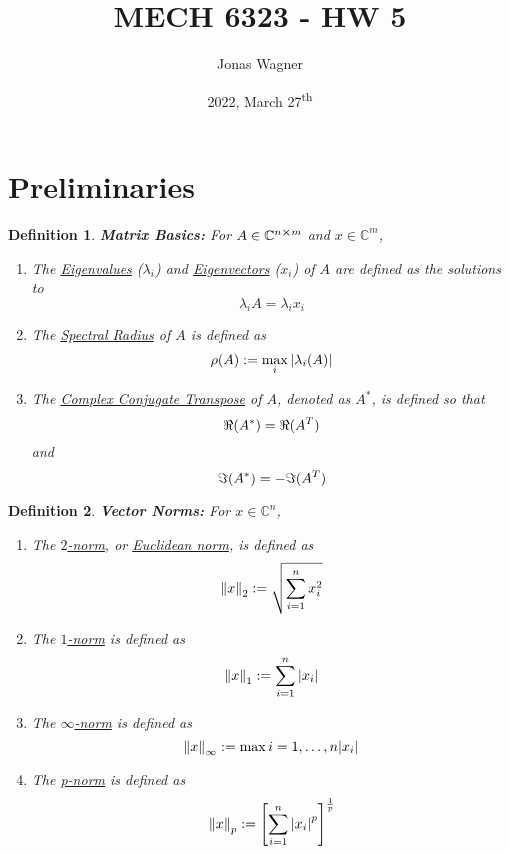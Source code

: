 \documentclass[letter]{article}
\title{MECH 6323 - HW 5}
\author{Jonas Wagner}
\date{2022, March 27\textsuperscript{th}}
\numberwithin{equation}{section}
\newcommand{\C}{\mathbb{C}}
\newtheorem{definition}{Definition}
\begin{document}
	

\maketitle

\tableofcontents



\newpage
\section*{Preliminaries}

\begin{definition}
    \textbf{Matrix Basics:} 
    For $A \in \C^{n \cross m}$ and $x \in \C^{m}$,
    \begin{enumerate}
        \item The \emph{\underline{Eigenvalues}} ($\lambda_i$) and \emph{\underline{Eigenvectors}} ($x_i$) of $A$ are defined as the solutions to \[
            \lambda_i A = \lambda_i x_i
        \] 
        \item The \emph{\underline{Spectral Radius}} of $A$ is defined as \[
            \rho(A) := \max_{i} \abs{\lambda_i(A)}
        \]
        \item The \emph{\underline{Complex Conjugate Transpose}} of $A$, denoted as $A^*$, is defined so that \[
            \real(A^*) = \real(A^T)
        \] and \[
            \imaginary(A^*) = - \imaginary(A^T)
        \]
    \end{enumerate}
\end{definition}

\begin{definition}
    \textbf{Vector Norms:} 
    For $x \in \C^{n}$,
    \begin{enumerate}
        \item The \emph{\underline{$2$-norm}}, or \emph{\underline{Euclidean norm}}, is defined as\[
            \norm{x}_2 := \sqrt{\sum_{i=1}^{n} x_{i}^{2}}
        \] 
        \item The \emph{\underline{$1$-norm}} is defined as\[
            \norm{x}_1 := \sum_{i=1}^{n} \abs{x_{i}}
        \] 
        \item The \emph{\underline{$\infty$-norm}} is defined as\[
            \norm{x}_\infty := \max{i = 1,\dots,n} \abs{x_{i}}
        \] 
        \item The \emph{\underline{p-norm}} is defined as\[
            \norm{x}_p := \qty[\sum_{i=1}^{n} \abs{x_{i}}^{p}]^{\frac{1}{p}}
        \]
    \end{enumerate}
\end{definition}
\end{document}
